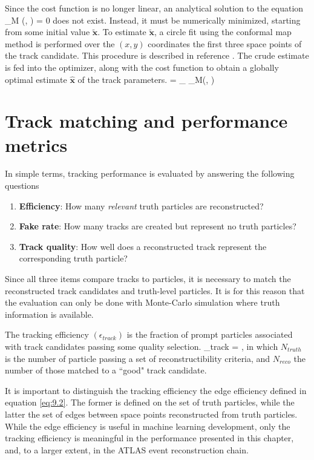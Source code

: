 Since the cost function is no longer linear, an analytical solution to the equation 
\beq
\label{eq:track-performance:4-1}
\nabla{}_M (, {\vartheta}) = 0
\eeq
does not exist.
Instead, it must be numerically minimized, starting from some initial value $\tilde{\mathbf{x}}$.
To estimate $\tilde{\mathbf{x}}$, a circle fit using the conformal map method is performed over the $(x,y)$ coordinates the first three space points of the track candidate. 
This procedure is described in reference \cite{HANSROUL1988498}. 
The crude estimate is fed into the optimizer, along with the cost function to obtain a globally optimal estimate $\hat{\mathbf{x}}$ of the track parameters. 
\beq
\label{eq:track-performance:6}
 = \min_{} _M(, \vartheta)
\eeq


\section{Track matching and performance metrics}
\label{sect:track-match-metrics}

In simple terms, tracking performance is evaluated by answering the following questions
\begin{enumerate}
    \item \textbf{Efficiency}: How many \textit{relevant} truth particles are reconstructed?
    \item \textbf{Fake rate}: How many tracks are created but represent no truth particles?
    \item \textbf{Track quality}: How well does a reconstructed track represent the corresponding truth particle?
\end{enumerate}
Since all three items compare tracks to particles, it is necessary to match the reconstructed track candidates and truth-level particles. 
It is for this reason that the evaluation can only be done with Monte-Carlo simulation where truth information is available. 

\begin{definition}
    \label{def:tracking-efficiency}
    The tracking efficiency $(\epsilon_{track})$ is the fraction of prompt particles associated with track candidates passing some quality selection. 
    \beq \label{eq:track-performance:7}
    \epsilon_{track} = ,
    \eeq
    in which $N_{truth}$ is the number of particle passing a set of reconstructibility criteria, and $N_{reco}$ the number of those matched to a ``good" track candidate.
\end{definition}
It is important to distinguish the tracking efficiency the edge efficiency defined in equation \eqref{eq:9.2}. 
The former is defined on the set of truth particles, while the latter the set of edges between space points reconstructed from truth particles. 
While the edge efficiency is useful in machine learning development, only the tracking efficiency is meaningful in the performance presented in this chapter, and, to a larger extent, in the ATLAS event reconstruction chain.

